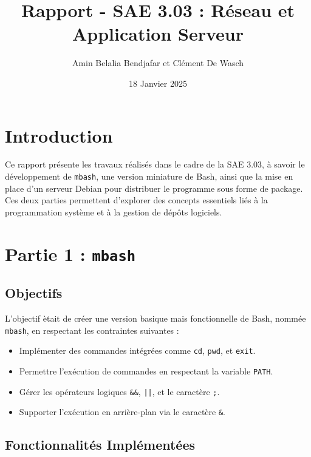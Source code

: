 \documentclass[11pt,a4paper]{article}
\title{Rapport - SAE 3.03 : R\'eseau et Application Serveur}
\author{Amin Belalia Bendjafar et Cl\'ement De Wasch}
\date{18 Janvier 2025}
\begin{document}
\maketitle

\tableofcontents

\section{Introduction}

Ce rapport pr\'esente les travaux r\'ealis\'es dans le cadre de la SAE 3.03, \`a savoir le d\'eveloppement de \texttt{mbash}, une version miniature de Bash, ainsi que la mise en place d'un serveur Debian pour distribuer le programme sous forme de package. Ces deux parties permettent d'explorer des concepts essentiels li\'es \`a la programmation syst\`eme et \`a la gestion de d\'ep\^ots logiciels.

\section{Partie 1 : \texttt{mbash}}

\subsection{Objectifs}

L'objectif \`etait de cr\'eer une version basique mais fonctionnelle de Bash, nomm\'ee \texttt{mbash}, en respectant les contraintes suivantes :
\begin{itemize}
    \item Impl\'ementer des commandes int\'egr\'ees comme \texttt{cd}, \texttt{pwd}, et \texttt{exit}.
    \item Permettre l'ex\'ecution de commandes en respectant la variable \texttt{PATH}.
    \item G\'erer les op\'erateurs logiques \texttt{\&\&}, \texttt{||}, et le caract\`ere \texttt{;}.
    \item Supporter l'ex\'ecution en arri\`ere-plan via le caract\`ere \texttt{\&}.
\end{itemize}

\subsection{Fonctionnalit\'es Impl\'ement\'ees}
\end{document}
